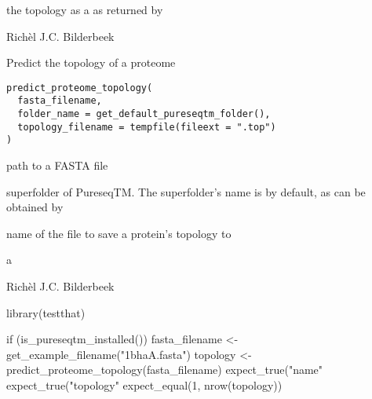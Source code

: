 \documentclass[letterpaper]{book}
\begin{document}
%
\begin{Arguments}
\begin{ldescription}
\item[\code{topology}] the topology as a 
as returned by 
\end{ldescription}
\end{Arguments}
%
\begin{Author}\relax
Richèl J.C. Bilderbeek
\end{Author}
%
\begin{Description}\relax
Predict the topology of a proteome
\end{Description}
%
\begin{Usage}
\begin{verbatim}
predict_proteome_topology(
  fasta_filename,
  folder_name = get_default_pureseqtm_folder(),
  topology_filename = tempfile(fileext = ".top")
)
\end{verbatim}
\end{Usage}
%
\begin{Arguments}
\begin{ldescription}
\item[\code{fasta\_filename}] path to a FASTA file

\item[\code{folder\_name}] superfolder of PureseqTM.
The superfolder's name is 
by default, as can be obtained by

\item[\code{topology\_filename}] name of the file to save a protein's
topology to
\end{ldescription}
\end{Arguments}
%
\begin{Value}
a 
\end{Value}
%
\begin{Author}\relax
Richèl J.C. Bilderbeek
\end{Author}
%
\begin{Examples}
\begin{ExampleCode}
library(testthat)

if (is_pureseqtm_installed()) {
  fasta_filename <- get_example_filename("1bhaA.fasta")
  topology <- predict_proteome_topology(fasta_filename)
  expect_true("name" %
  expect_true("topology" %
  expect_equal(1, nrow(topology))
}
\end{ExampleCode}
\end{Examples}
\end{document}
